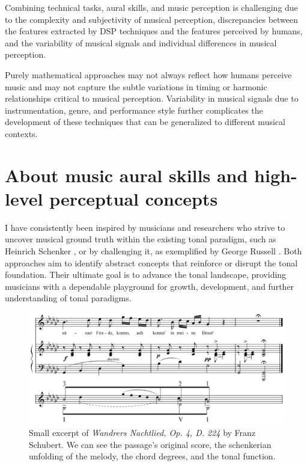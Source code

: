 Combining technical tasks, aural skills, and music perception is challenging due to the complexity and subjectivity of musical perception, discrepancies between the features extracted by DSP techniques and the features perceived by humans, and the variability of musical signals and individual differences in musical perception. 

Purely mathematical approaches may not always reflect how humans perceive music and may not capture the subtle variations in timing or harmonic relationships critical to musical perception. Variability in musical signals due to instrumentation, genre, and performance style further complicates the development of these techniques that can be generalized to different musical contexts.

\section{About music aural skills and high-level perceptual concepts}

I have consistently been inspired by musicians and researchers who strive to uncover musical ground truth within the existing tonal paradigm, such as Heinrich Schenker \cite{}, or by challenging it, as exemplified by George Russell \cite{LydianRussell}. Both approaches aim to identify abstract concepts that reinforce or disrupt the tonal foundation. Their ultimate goal is to advance the tonal landscape, providing musicians with a dependable playground for growth, development, and further understanding of tonal paradigms.


\begin{figure}[ht]
\includegraphics[clip,width=\columnwidth]{figures/schenkerian analysis/SchubertOp4no3.png}%
\caption{Small excerpt of \textit{Wandrers Nachtlied, Op. 4, D. 224} by Franz Schubert. We can see the passage's original score, the schenkerian unfolding of the melody, the chord degrees, and the tonal function.}
\label{fig:Wandrers Nachtlied, Op. 4, D. 224}
\end{figure}

